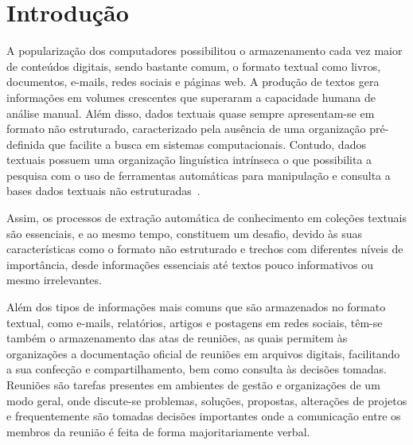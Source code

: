 \chapter{Introdução}\label{cap1}

\let\cleardoublepage\clearpage


A popularização dos computadores possibilitou o armazenamento cada vez maior de conteúdos digitais, sendo bastante comum, o formato textual como livros, documentos, e-mails, redes sociais e páginas web. A produção de textos gera informações em volumes crescentes que superaram a capacidade humana de análise manual.  %
%
Além disso, dados textuais quase sempre apresentam-se em formato não estruturado, caracterizado pela ausência de uma organização pré-definida que facilite a busca em sistemas computacionais.
%
Contudo, dados textuais possuem uma organização linguística intrínseca o que possibilita a pesquisa com o uso de ferramentas automáticas para manipulação e consulta a bases dados textuais não estruturadas~\cite{Cao:2017, Manning2008}. 



Assim, os processos de extração automática de conhecimento em coleções textuais são essenciais, e ao mesmo tempo, constituem um desafio, devido às suas características como o formato não estruturado e trechos com diferentes níveis de importância, desde informações essenciais até textos pouco informativos ou mesmo irrelevantes. 

Além dos tipos de informações mais comuns que são armazenados no formato textual, como e-mails, relatórios, artigos e postagens em redes sociais, têm-se também o armazenamento das atas de reuniões, as quais permitem às organizações a documentação oficial de reuniões em arquivos digitais, facilitando a sua confecção e compartilhamento, bem como consulta às decisões tomadas.
% 
% 
% 
Reuniões são tarefas presentes em ambientes de gestão e organizações de um modo geral, onde discute-se problemas, soluções, propostas, alterações de projetos e frequentemente são tomadas decisões importantes onde a comunicação entre os membros da reunião é feita de forma majoritariamente verbal. 

